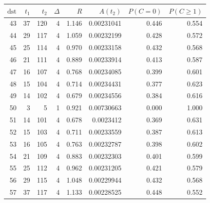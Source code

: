 \begin{tabular}{r r r r r r r r}
\toprule
$\mathrm{dst}$ & $t_1$ & $t_2$ & $\Delta$ & $R$ & $A(t_2)$ & $P(C=0)$ & $P(C\ge1)$ \\
\midrule
43 & 37 & 120 & 4 & 1.146 & 0.00231041 & 0.446 & 0.554 \\
44 & 29 & 117 & 4 & 1.059 & 0.00232199 & 0.428 & 0.572 \\
45 & 25 & 114 & 4 & 0.970 & 0.00233158 & 0.432 & 0.568 \\
46 & 21 & 111 & 4 & 0.889 & 0.00233914 & 0.413 & 0.587 \\
47 & 16 & 107 & 4 & 0.768 & 0.00234085 & 0.399 & 0.601 \\
48 & 15 & 104 & 4 & 0.714 & 0.00234431 & 0.377 & 0.623 \\
49 & 14 & 102 & 4 & 0.679 & 0.00234556 & 0.384 & 0.616 \\
50 & 3 & 5 & 1 & 0.921 & 0.00730663 & 0.000 & 1.000 \\
51 & 14 & 101 & 4 & 0.678 & 0.0023412 & 0.369 & 0.631 \\
52 & 15 & 103 & 4 & 0.711 & 0.00233559 & 0.387 & 0.613 \\
53 & 16 & 105 & 4 & 0.763 & 0.00232787 & 0.398 & 0.602 \\
54 & 21 & 109 & 4 & 0.883 & 0.00232303 & 0.401 & 0.599 \\
55 & 25 & 112 & 4 & 0.962 & 0.00231205 & 0.421 & 0.579 \\
56 & 29 & 115 & 4 & 1.048 & 0.00229944 & 0.432 & 0.568 \\
57 & 37 & 117 & 4 & 1.133 & 0.00228525 & 0.448 & 0.552 \\
\bottomrule
\end{tabular}
